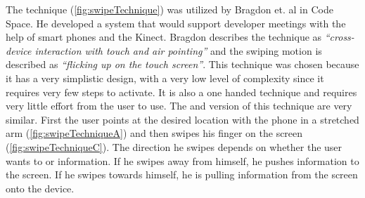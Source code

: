\begin{figure}[H]
	\label{fig:grabTechnique}
\end{figure}

The \swipe technique (\cref{fig:swipeTechnique}) was utilized by Bragdon et. al  in Code Space.
He developed a system that would support developer meetings with the help of smart phones and the Kinect. Bragdon describes the technique as \emph{``cross-device interaction with touch and air pointing''} and the swiping motion is described as \emph{``flicking up on the touch screen''}.
This technique was chosen because it has a very simplistic design, with a very low level of complexity since it requires very few steps to activate.
It is also a one handed technique and requires very little effort from the user to use.
The \push and \pull version of this technique are very similar.
First the user points at the desired location with the phone in a stretched arm (\cref{fig:swipeTechniqueA}) and then swipes his finger on the screen (\cref{fig:swipeTechniqueC}).
The direction he swipes depends on whether the user wants to \push or \pull information.
If he swipes away from himself, he pushes information to the screen.
If he swipes towards himself, he is pulling information from the screen onto the device.  


